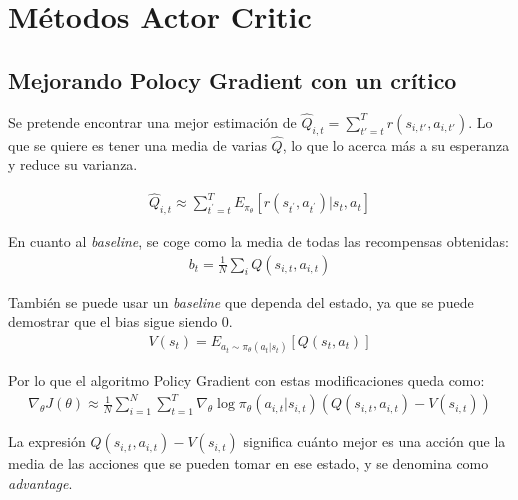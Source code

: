 \chapter{Métodos Actor Critic}%
\label{cha:métodos_actor_critic}


\section{Mejorando Polocy Gradient con un crítico}%
\label{sec:mejorando_polocy_gradient_con_un_crítico}

Se pretende encontrar una mejor estimación de $\hat{Q}_{i,t} = \sum_{t'=t}^T
r(s_{i,t'},a_{i,t'})$. Lo que se quiere es tener una media de varias $\hat{Q}$, lo que lo
acerca más a su esperanza y reduce su varianza.

\begin{align}
\hat { Q } _ { i , t } \approx \sum _ { t ^ { \prime } = t } ^ { T } E _ { \pi _ { \theta } } [ r ( s _ { t ^ { \prime } } , a _ { t ^ { \prime } } ) | s _ { t } , a _ { t } ]
\end{align}

En cuanto al \textit{baseline}, se coge como la media de todas las recompensas
obtenidas:
\begin{align}
    b_t = \frac{1}{N} \sum_i Q(s_{i,t},a_{i,t})
\end{align}

También se puede usar un \textit{baseline} que dependa del estado, ya que se puede demostrar que
el bias sigue siendo 0.
\begin{align}
V ( s _ { t } ) = E _ { a _ { t } \sim \pi _ { \theta } ( a _ { t } | s _ { t } ) } [ Q ( s _ { t } , a _ { t } ) ]
\end{align}

Por lo que el algoritmo Policy Gradient con estas modificaciones queda como:
\begin{align}
\nabla _ { \theta } J ( \theta ) \approx \frac { 1 } { N } \sum _ { i = 1 } ^ { N } \sum _ { t = 1 } ^ { T } \nabla _ { \theta } \operatorname { log } \pi _ { \theta } ( a _ { i , t } | s _ { i , t } ) ( Q ( s _ { i , t } , a _ { i , t } ) - V ( s _ { i , t } ) )
\end{align}

La expresión $ Q ( s _ { i , t } , a _ { i , t } ) - V ( s _ { i , t } ) $ significa cuánto
mejor es una acción que la media de las acciones que se pueden tomar en ese estado, y se
denomina como \textit{advantage}.

